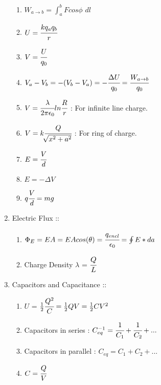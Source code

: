 \documentclass[12pt]{article}
\begin{document}
\begin{enumerate}
\begin{enumerate}
		\item[] $W_{a \rightarrow b} = \int_a^b Fcos\phi$ $dl$
		\item[] $U = \cfrac{kq_aq_b}{r}$	
		\item[] $V = \cfrac{U}{q_0}$
		\item[] $V_a - V_b = -(V_b - V_a) = -\cfrac{\Delta U}{q_0} = \cfrac{W_{a \rightarrow b}}{q_0}$
		\item[] $V = \cfrac{\lambda}{2\pi \epsilon_0}ln\cfrac{R}{r}$ : For infinite line charge.
		\item[] $V = k\cfrac{Q}{\sqrt[]{x^2 + a^2}}$ : For ring of charge.
		\item[] $E = \cfrac{V}{d}$
		\item[] $E = -\Delta V$
		\item[] $q\cfrac{V}{d} = mg$ \\
	\end{enumerate}
	\item[] Electric Flux :: 
	\begin{enumerate}
		\item[] $\Phi_E = EA = EAcos(\theta) = \cfrac{q_{encl}}{\epsilon_0} = \oint E*da$
		\item[] Charge Density $\lambda$ = $\cfrac{Q}{L}$\\
	\end{enumerate}
	\item[] Capacitors and Capacitance :: 
	\begin{enumerate}
		\item[] $U$ = $\frac{1}{2}\cfrac{Q^2}{C} = \frac{1}{2}QV = \frac{1}{2}CV^2$
		\item[] Capacitors in series : $C_{eq}^{-1} = \cfrac{1}{C_1} + \cfrac{1}{C_2} + ...$
		\item[] Capacitors in parallel : $C_{eq} = C_1 + C_2 + ...$
		\item[] $C = \cfrac{Q}{V}$
		\end{enumerate}

\end{enumerate}
\end{document}
